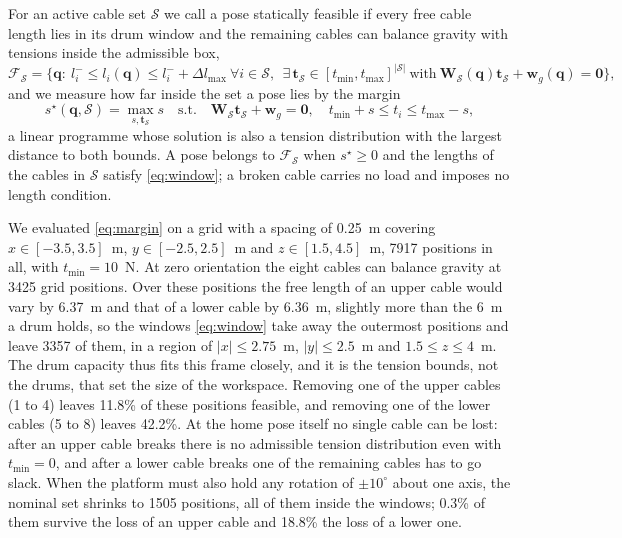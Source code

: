 \documentclass[10pt]{article}
\newcommand{\vc}[1]{\bm{#1}}
\newcommand{\mt}[1]{\mathbf{#1}}
\begin{document}
For an active cable set $\mathcal S$ we call a pose statically feasible if every free cable length lies in its drum window and the remaining cables can balance gravity with tensions inside the admissible box,
\begin{equation}\label{eq:wfw}
\mathcal F_{\mathcal S}=\big\{\vc q:\ l_i^-\le l_i(\vc q)\le l_i^-+\Delta l_{\max}\ \forall i\in\mathcal S,\ \ \exists\,\vc t_{\mathcal S}\in[t_{\min},t_{\max}]^{|\mathcal S|}\ \text{with}\ \mt W_{\mathcal S}(\vc q)\vc t_{\mathcal S}+\vc w_g(\vc q)=\vc 0\big\},
\end{equation}
and we measure how far inside the set a pose lies by the margin
\begin{equation}\label{eq:margin}
s^\star(\vc q,\mathcal S)=\max_{s,\vc t_{\mathcal S}} s\quad\text{s.t.}\quad \mt W_{\mathcal S}\vc t_{\mathcal S}+\vc w_g=\vc 0,\quad t_{\min}+s\le t_i\le t_{\max}-s ,
\end{equation}
a linear programme whose solution is also a tension distribution with the largest distance to both bounds. A pose belongs to $\mathcal F_{\mathcal S}$ when $s^\star\ge0$ and the lengths of the cables in $\mathcal S$ satisfy \eqref{eq:window}; a broken cable carries no load and imposes no length condition.

We evaluated \eqref{eq:margin} on a grid with a spacing of 0.25~m covering $x\in[-3.5,3.5]$~m, $y\in[-2.5,2.5]$~m and $z\in[1.5,4.5]$~m, 7917 positions in all, with $t_{\min}=10$~N. At zero orientation the eight cables can balance gravity at 3425 grid positions. Over these positions the free length of an upper cable would vary by 6.37~m and that of a lower cable by 6.36~m, slightly more than the 6~m a drum holds, so the windows \eqref{eq:window} take away the outermost positions and leave 3357 of them, in a region of $|x|\le2.75$~m, $|y|\le2.5$~m and $1.5\le z\le4$~m. The drum capacity thus fits this frame closely, and it is the tension bounds, not the drums, that set the size of the workspace. Removing one of the upper cables (1 to 4) leaves 11.8\% of these positions feasible, and removing one of the lower cables (5 to 8) leaves 42.2\%. At the home pose itself no single cable can be lost: after an upper cable breaks there is no admissible tension distribution even with $t_{\min}=0$, and after a lower cable breaks one of the remaining cables has to go slack. When the platform must also hold any rotation of $\pm10^\circ$ about one axis, the nominal set shrinks to 1505 positions, all of them inside the windows; 0.3\% of them survive the loss of an upper cable and 18.8\% the loss of a lower one.
\end{document}
